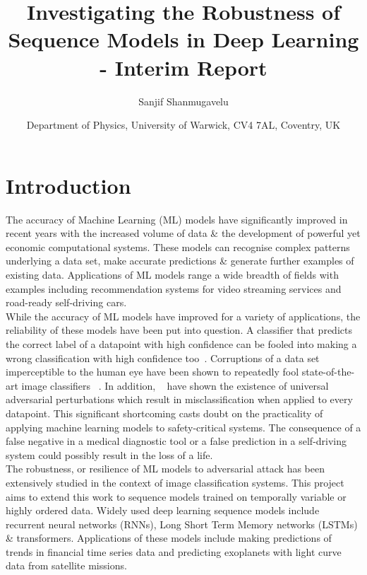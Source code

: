 \documentclass[a4paper,singlecolumn,12pt]{article}
\title{\textbf{Investigating the Robustness of Sequence Models in Deep Learning - Interim Report}}
\author{\Large Sanjif Shanmugavelu}
\date{Department of Physics, University of Warwick, CV4 7AL, Coventry, UK}
\begin{document}
\maketitle

\section{Introduction}


The accuracy of Machine Learning (ML) models have significantly improved in recent years with the increased volume of data \& the development of powerful yet economic computational systems. These models can recognise complex patterns underlying a data set, make accurate predictions \& generate further examples of existing data. Applications of ML models range a wide breadth of fields with examples including recommendation systems for video streaming services and road-ready self-driving cars.\\

While the accuracy of ML models have improved for a variety of applications, the reliability of these models have been put into question. A classifier that predicts the correct label of a datapoint with high confidence can be fooled into making a wrong classification with high confidence too~\cite{moosavi-dezfooli2018robustness, Adversarial_CoRR_2015}. Corruptions of a data set imperceptible to the human eye have been shown to repeatedly fool state-of-the-art image classifiers ~\cite{Adversarial_CoRR_2015}. In addition, ~\cite{moosavi-dezfooli2018robustness} have shown the existence of universal adversarial perturbations which result in misclassification when applied to every datapoint. This significant shortcoming casts doubt on the practicality of applying machine learning models to safety-critical systems. The consequence of a false negative in a medical diagnostic tool or a false prediction in a self-driving system could possibly result in the loss of a life.\\

The robustness, or resilience of ML models to adversarial attack has been extensively studied in the context of image classification systems. This project aims to extend this work to sequence models trained on temporally variable or highly ordered data. Widely used deep learning sequence models include recurrent neural networks (RNNs), Long Short Term Memory networks (LSTMs) \& transformers. Applications of these models include making predictions of trends in financial time series data and predicting exoplanets with light curve data from satellite missions.\\
\end{document}
